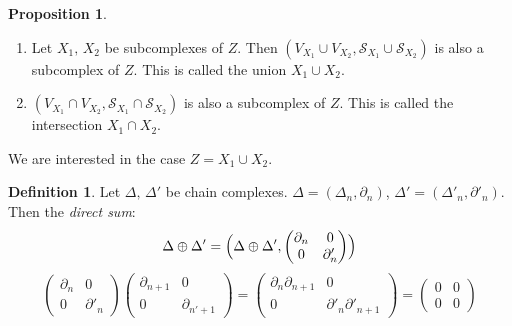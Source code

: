 \documentclass[a4paper,14pt]{extarticle}
\theoremstyle{definition}
\newtheorem*{definition}{Definition}
\newtheorem*{proposition}{Proposition}
\begin{document}
\begin{proposition} \hfill
	\begin{enumerate}
		\item Let $X_1, \,X_2$ be subcomplexes of $Z$. Then 
				$(V_{X_1}\cup V_{X_2}, \mathcal{S}_{X_1}\cup \mathcal{S}_{X_2})$
				is also a subcomplex of $Z$. This is called the
				union $X_1\cup X_2$.
		\item $(V_{X_1}\cap V_{X_2}, \mathcal{S}_{X_1}\cap\mathcal{S}_{X_2})$
				is also a subcomplex of $Z$. This is 
				called the intersection $X_1\cap X_2$.
	\end{enumerate}
	We are
	interested in the case $Z=X_1\cup X_2$.
\end{proposition}

\begin{definition}
	Let $\Delta, \,\Delta'$ be chain complexes. $\Delta=(\Delta_n,\partial_n)$,
	$\Delta'=(\Delta'_n,\partial'_n)$. Then the \emph{direct sum}:
	\[\Delta\oplus\Delta'=\Bigl(\Delta\oplus\Delta',\begin{pmatrix}
		\partial_n & 0 \\ 0 & \partial'_n
	\end{pmatrix}\Bigr)\]
	\[
		\begin{pmatrix}
			\partial_n & 0 \\ 0 & \partial'_n
		\end{pmatrix}
		\begin{pmatrix}
			\partial_{n+1} & 0 \\ 0 & \partial_{n'+1}
		\end{pmatrix}
		=
		\begin{pmatrix}
			\partial_n\partial_{n+1} & 0 \\ 0 & \partial'_n\partial'_{n+1}
		\end{pmatrix}
		=
		\begin{pmatrix}
			0 & 0 \\ 0 & 0
		\end{pmatrix}
	\]
\end{definition}
\end{document}
